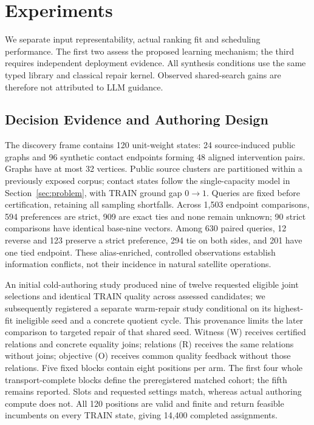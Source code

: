 \section{Experiments}
\label{sec:experiments}

We separate input representability, actual ranking fit and scheduling
performance. The first two assess the proposed learning mechanism; the third
requires independent deployment evidence. All synthesis conditions use the
same typed library and classical repair kernel. Observed shared-search gains
are therefore not attributed to LLM guidance.

\subsection{Decision Evidence and Authoring Design}
The discovery frame contains 120 unit-weight states: 24 source-induced public
graphs and 96 synthetic contact endpoints forming 48 aligned intervention
pairs. Graphs have at most 32 vertices. Public source clusters are partitioned
within a previously exposed corpus; contact states follow the single-capacity
model in Section~\ref{sec:problem}, with TRAIN ground gap $0\!\to\!1$.
Queries are fixed before certification, retaining all sampling shortfalls.
Across 1,503 endpoint comparisons, 594 preferences are strict, 909 are exact
ties and none remain unknown; 90 strict comparisons have identical base-nine
vectors. Among 630 paired queries, 12 reverse and 123 preserve a strict
preference, 294 tie on both sides, and 201 have one tied endpoint. These
alias-enriched, controlled observations establish information conflicts,
not their incidence in natural satellite operations.

An initial cold-authoring study produced nine of twelve requested eligible
joint selections and identical TRAIN quality across assessed candidates;
we subsequently registered a separate warm-repair study conditional on its
highest-fit ineligible seed and a concrete quotient cycle. This provenance
limits the later comparison to targeted repair of that shared seed.
Witness (W) receives certified relations and concrete equality joins;
relations (R) receives the same relations without joins; objective (O)
receives common quality feedback without those relations. Five fixed blocks
contain eight positions per arm. The first four whole transport-complete
blocks define the preregistered matched cohort; the fifth remains reported.
Slots and requested settings match, whereas actual authoring compute does
not. All 120 positions are valid and finite and return feasible incumbents
on every TRAIN state, giving 14,400 completed assignments.


